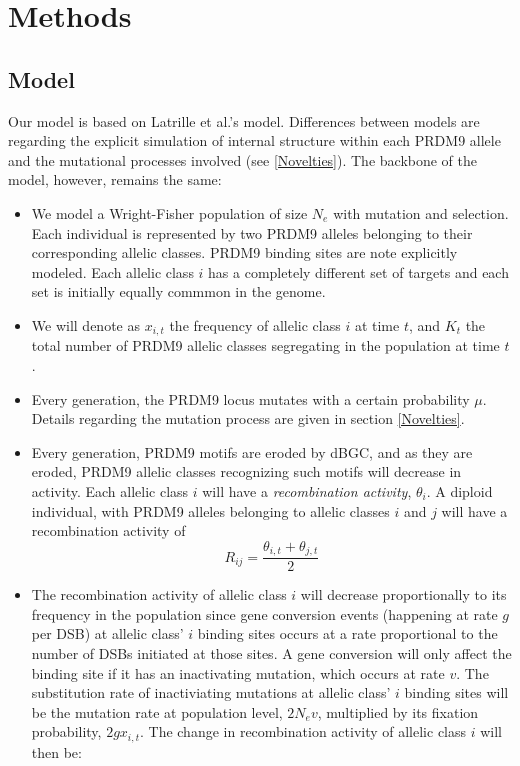 \documentclass[a4paper,10pt]{article}
\begin{document}
\section{Methods}

\subsection{Model}
Our model is based on Latrille et al.'s \cite{Latrille2017} model. Differences between models are regarding the explicit simulation of internal structure within each PRDM9 allele and the mutational processes involved (see \ref{Novelties}). The backbone of the model, however, remains the same:
\begin{itemize}
 \item We model a Wright-Fisher population of size $N_e$ with mutation and selection. Each individual is represented by two PRDM9 alleles belonging to their corresponding allelic classes. PRDM9 binding sites are note explicitly modeled. Each allelic class $i$ has a completely different set of targets and each set is initially equally commmon in the genome. 
 \item We will denote as $x_{i,t}$ the frequency of allelic class $i$ at time $t$, and $K_t$ the total number of PRDM9 allelic classes segregating in the population at time $t$.
 \item Every generation, the PRDM9 locus mutates with a certain probability $\mu$. Details regarding the mutation process are given in section \ref{Novelties}.
 \item Every generation, PRDM9 motifs are eroded by dBGC, and as they are eroded, PRDM9 allelic classes recognizing such motifs will decrease in activity. Each allelic class $i$ will have a \textit{recombination activity}, $\theta_i$. A diploid individual, with PRDM9 alleles belonging to allelic classes $i$ and $j$ will have a recombination activity of 
 \begin{equation}
  R_{ij} = \dfrac{\theta_{i,t} + \theta_{j,t}}{2}
 \end{equation}
 \item The recombination activity of allelic class $i$ will decrease proportionally to its frequency in the population since gene conversion events (happening at rate $g$ per DSB) at allelic class' $i$ binding sites occurs at a rate proportional to the number of DSBs initiated at those sites. A gene conversion will only affect the binding site if it has an inactivating mutation, which occurs at rate $v$. The substitution rate of inactiviating mutations at allelic class' $i$ binding sites will be the mutation rate at population level, $2 N_{e}v$, multiplied by its fixation probability, $2 g x_{i,t}$. The change in recombination activity of allelic class $i$ will then be:

\end{itemize}
\end{document}
